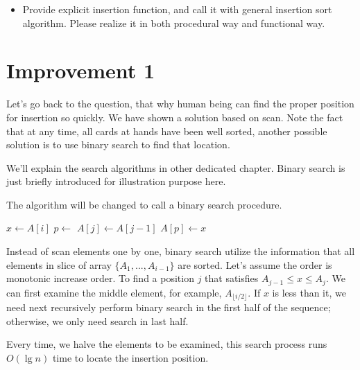 \documentclass{article}
\begin{document}
\begin{Exercise}

\begin{itemize}
\item Provide explicit insertion function, and call it with general
insertion sort algorithm. Please realize it in both procedural way and
functional way.
\end{itemize}

\end{Exercise}


\section{Improvement 1}

Let's go back to the question, that why human being can find the proper
position for insertion so quickly. We have shown a solution based on scan.
Note the fact that at any time, all cards at hands have been well sorted,
another possible solution is to use binary search to find that location.

We'll explain the search algorithms in other dedicated chapter. Binary
search is just briefly introduced for illustration purpose here.

The algorithm will be changed to call a binary search procedure.

\begin{algorithmic}
    \State $x \gets A[i]$
    \State $p \gets $ 
      \State $A[j] \gets A[j-1]$
    \EndFor
    \State $A[p] \gets x$
  \EndFor
\EndFunction
\end{algorithmic}

Instead of scan elements one by one, binary search utilize the information
that all elements in slice of array $\{A_1, ..., A_{i-1} \}$ are sorted.
Let's assume
the order is monotonic increase order. To find a position $j$ that satisfies
$A_{j-1} \leq x \leq A_{j}$. We can first examine the middle element, for
example, $A_{\lfloor i/2 \rfloor}$. If $x$ is less than it, we need next recursively
perform binary search in the first half of the sequence; otherwise, we
only need search in last half.

Every time, we halve the elements to be examined, this search process runs
$O(\lg n)$ time to locate the insertion position.
\end{document}
